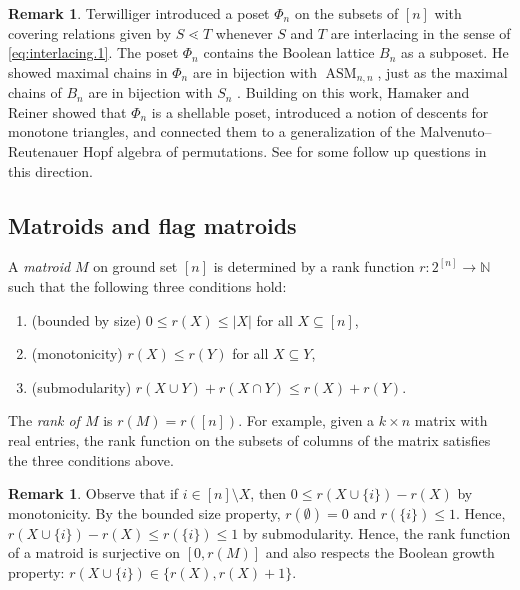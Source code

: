 \documentclass[12pt]{amsart}
\numberwithin{equation}{section}
\theoremstyle{definition}
\newtheorem{remark}[theorem]{Remark}
\newcommand{\ASM}{\operatorname{ASM}}
\begin{document}
\begin{remark}\label{rem:TerwilligerPoset}
Terwilliger introduced a poset $\Phi_{n}$ on the subsets of $[n]$ with
covering relations given by $S \lessdot T$ whenever $S$ and $T$ are
interlacing in the sense of \eqref{eq:interlacing.1}.  The poset
$\Phi_{n}$ contains the Boolean lattice $B_{n}$ as a subposet.  He
showed maximal chains in $\Phi_{n}$ are in bijection with $\ASM_{n,n}$,
just as the maximal chains of $B_{n}$ are in bijection with $S_{n}$
\cite[Thm. 3.4]{Terwilliger.2018}.  Building on this work, Hamaker and
Reiner \cite{hamakerreiner} showed that $\Phi_{n}$ is a shellable
poset, introduced a notion of descents for monotone triangles, and connected them to a
generalization of the Malvenuto--Reutenauer Hopf algebra of
permutations.  See  for some follow up
questions in this direction.
\end{remark}

\subsection{Matroids and flag matroids}\label{sub:matroids}

A \emph{matroid} $M$ on ground set $[n]$ is determined by a rank
function $r:2^{[n]} \longrightarrow \mathbb{N}$ such that the following three conditions
hold:
\begin{enumerate}
\item (bounded by size) $0\leq r(X) \leq |X|$ for all $X \subseteq [n]$,
\item (monotonicity) $r(X)\leq r(Y)$ for all $X \subseteq Y$,
\item (submodularity) $r(X \cup Y) + r(X \cap Y) \leq r(X) + r(Y)$.
\end{enumerate}
The \emph{rank of $M$} is $r(M)=r([n])$.  For example, given a $k
\times n$ matrix with real entries, the rank function on the subsets
of columns of the matrix satisfies the three conditions above.   


\begin{remark}\label{rem:matroid.dedekind.map}
Observe that if $i \in [n] \setminus X$, then $0\leq r(X \cup
\{i\})-r(X)$ by monotonicity.  By the bounded size property,
$r(\emptyset)=0$ and $r(\{i \})\leq 1$.  Hence, $r(X \cup
\{i\})-r(X)\leq r(\{i \})\leq 1$ by submodularity.  Hence, the rank
function of a matroid is surjective on $[0,r(M)]$ and also respects
the Boolean growth property: $r(X \cup \{i\}) \in \{r(X), r(X)+1 \}$.
\end{remark}
\end{document}
